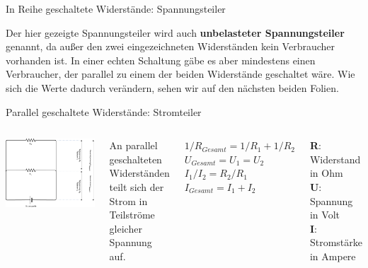 {\begin{frame}{In Reihe geschaltete Widerstände: Spannungsteiler}
    \bigskip

    \parbox{\linewidth}{
        \footnotesize
        Der hier gezeigte Spannungsteiler wird auch \textbf{unbelasteter Spannungsteiler}
        genannt, da außer den zwei eingezeichneten Widerständen kein Verbraucher vorhanden
        ist. In einer echten Schaltung gäbe es aber mindestens einen Verbraucher, der parallel
        zu einem der beiden Widerstände geschaltet wäre. Wie sich die Werte dadurch verändern,
        sehen wir auf den nächsten beiden Folien.
    }
\end{frame}
}

{
\small

\begin{frame}{Parallel geschaltete Widerstände: Stromteiler}
    \begin{columns}
        \includegraphics[width=.9\textwidth]{2-hardwaredesign/img/stromteiler}

        An parallel geschalteten Widerständen teilt sich der Strom in
        Teilströme gleicher Spannung auf.

        \bigskip

        $1/R_{Gesamt} = 1/R_1 + 1/R_2$ \\
        \smallskip
        $U_{Gesamt} = U_1 = U_2$ \\
        \smallskip
        $I_1 / I_2 = R_2 / R_1$ \\
        \smallskip
        $I_{Gesamt} = I_1 + I_2$ \\

        \bigskip

        \textbf{R}: Widerstand in Ohm \\
        \smallskip
        \textbf{U}: Spannung in Volt \\
        \smallskip
        \textbf{I}: Stromstärke in Ampere \\
    \end{columns}


\end{frame}}
